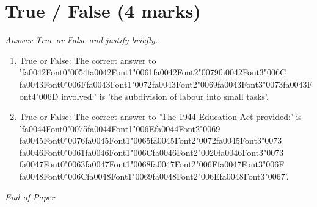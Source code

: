 \documentclass[12pt]{article}
\begin{document}
\section*{True / False (4 marks)}
\textit{Answer True or False and justify briefly.}
\begin{enumerate}[label=\arabic*.]
\item True or False: The correct answer to '{\csname fa0042Font0\endcsname\char"0054}{\csname fa0042Font1\endcsname\char"0061}{\csname fa0042Font2\endcsname\char"0079}{\csname fa0042Font3\endcsname\char"006C} {\csname fa0043Font0\endcsname\char"006F}{\csname fa0043Font1\endcsname\char"0072}{\csname fa0043Font2\endcsname\char"0069}{\csname fa0043Font3\endcsname\char"0073}{\csname fa0043Font4\endcsname\char"006D} involved:' is 'the subdivision of labour into small tasks'.
\item True or False: The correct answer to 'The 1944 Education Act provided:' is '{\csname fa0044Font0\endcsname\char"0075}{\csname fa0044Font1\endcsname\char"006E}{\csname fa0044Font2\endcsname\char"0069} {\csname fa0045Font0\endcsname\char"0076}{\csname fa0045Font1\endcsname\char"0065}{\csname fa0045Font2\endcsname\char"0072}{\csname fa0045Font3\endcsname\char"0073} {\csname fa0046Font0\endcsname\char"0061}{\csname fa0046Font1\endcsname\char"006C}{\csname fa0046Font2\endcsname\char"0020}{\csname fa0046Font3\endcsname\char"0073} {\csname fa0047Font0\endcsname\char"0063}{\csname fa0047Font1\endcsname\char"0068}{\csname fa0047Font2\endcsname\char"006F}{\csname fa0047Font3\endcsname\char"006F} {\csname fa0048Font0\endcsname\char"006C}{\csname fa0048Font1\endcsname\char"0069}{\csname fa0048Font2\endcsname\char"006E}{\csname fa0048Font3\endcsname\char"0067}'.
\end{enumerate}

\vfill
\noindent\textit{End of Paper}
\end{document}
